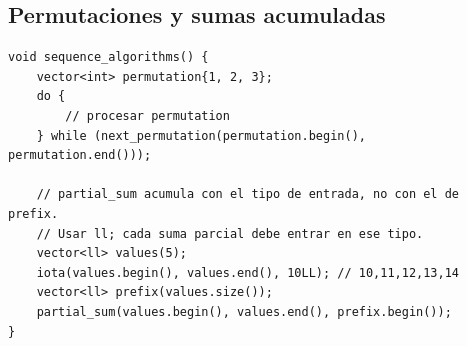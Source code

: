 \subsection{Permutaciones y sumas acumuladas}

\begin{lstlisting}[style=cpp]
void sequence_algorithms() {
    vector<int> permutation{1, 2, 3};
    do {
        // procesar permutation
    } while (next_permutation(permutation.begin(), permutation.end()));

    // partial_sum acumula con el tipo de entrada, no con el de prefix.
    // Usar ll; cada suma parcial debe entrar en ese tipo.
    vector<ll> values(5);
    iota(values.begin(), values.end(), 10LL); // 10,11,12,13,14
    vector<ll> prefix(values.size());
    partial_sum(values.begin(), values.end(), prefix.begin());
}
\end{lstlisting}

